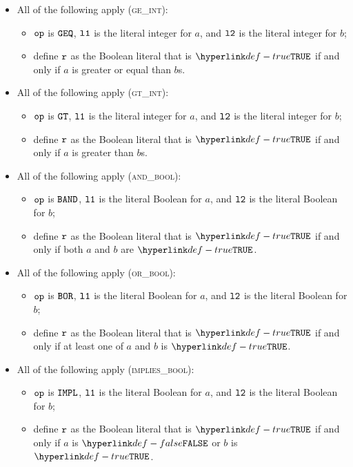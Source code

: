 \documentclass{book}
\begin{document}
\begin{itemize}
  \item All of the following apply (\textsc{ge\_int}):
  \begin{itemize}
    \item $\texttt{op}$ is $\texttt{GEQ}$, $\texttt{l1}$ is the literal integer for $a$, and $\texttt{l2}$ is the literal integer for $b$;
    \item define $\texttt{r}$ as the Boolean literal that is $\True$ if and only if $a$ is greater or equal than $b$s.
  \end{itemize}

  \item All of the following apply (\textsc{gt\_int}):
  \begin{itemize}
    \item $\texttt{op}$ is $\texttt{GT}$, $\texttt{l1}$ is the literal integer for $a$, and $\texttt{l2}$ is the literal integer for $b$;
    \item define $\texttt{r}$ as the Boolean literal that is $\True$ if and only if $a$ is greater than $b$s.
  \end{itemize}

  \item All of the following apply (\textsc{and\_bool}):
  \begin{itemize}
    \item $\texttt{op}$ is $\texttt{BAND}$, $\texttt{l1}$ is the literal Boolean for $a$, and $\texttt{l2}$ is the literal Boolean for $b$;
    \item define $\texttt{r}$ as the Boolean literal that is $\True$ if and only if both $a$ and $b$ are $\True$.
  \end{itemize}

  \item All of the following apply (\textsc{or\_bool}):
  \begin{itemize}
    \item $\texttt{op}$ is $\texttt{BOR}$, $\texttt{l1}$ is the literal Boolean for $a$, and $\texttt{l2}$ is the literal Boolean for $b$;
    \item define $\texttt{r}$ as the Boolean literal that is $\True$ if and only if at least one of $a$ and $b$ is $\True$.
  \end{itemize}

  \item All of the following apply (\textsc{implies\_bool}):
  \begin{itemize}
    \item $\texttt{op}$ is $\texttt{IMPL}$, $\texttt{l1}$ is the literal Boolean for $a$, and $\texttt{l2}$ is the literal Boolean for $b$;
    \item define $\texttt{r}$ as the Boolean literal that is $\True$ if and only if $a$ is $\False$ or $b$ is $\True$.
  \end{itemize}


\end{itemize}
\end{document}
